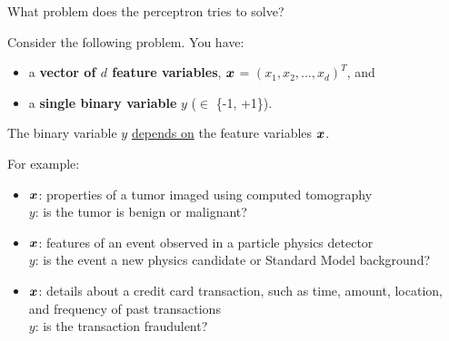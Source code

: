 \begin{frame}[t]{What problem does the perceptron tries to solve?}

    Consider the following problem. You have:
    \begin{itemize}
        \item a {\bf vector of $d$ feature variables}, $\boldsymbol{x}$ = $(x_1, x_2, ..., x_d)^T$, and
        \item a {\bf single binary variable} $y$ ($\in$ \{-1, +1\}).   
    \end{itemize}
    The binary variable $y$ \underline{depends on} the feature variables $\boldsymbol{x}$.\\
    \vspace{0.2cm}

    \begin{blockexample}{}
        \small
        For example:
        \begin{itemize}
            \small
            \item 
                $\boldsymbol{x}$: properties of a tumor imaged using computed tomography\\ 
                $y$: is the tumor is benign or malignant?
            \item 
                $\boldsymbol{x}$: features of an event observed in a particle physics detector\\ 
                $y$: is the event a new physics candidate 
                  or Standard Model background?
            \item 
                $\boldsymbol{x}$: details about a credit card transaction, such
                   as time, amount, location, and frequency of past transactions\\
                $y$: is the transaction fraudulent?
        \end{itemize}
    \end{blockexample}

\end{frame}

%
%
%

